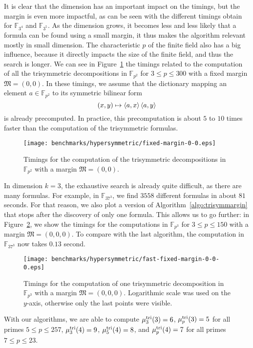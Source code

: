 It is clear that the dimension has an important impact on the timings, but the
margin is even more impactful, as can be seen with the different timings obtain
for $\mathbb{F}_{3^4}$ and $\mathbb{F}_{3^5}$. As the dimension grows, it
becomes less and less likely that a formula can be found using a small margin,
it thus makes the algorithm relevant mostly in small dimension. The
characteristic $p$ of the finite field also has a big influence, because it
directly impacts the size of the finite field, and thus the search is longer. We
can see in Figure~\ref{fig:fixed-margin-0-0} the timings related to the
computation of all the trisymmetric decompositions in $\mathbb{F}_{p^2}$ for
$3\leq p\leq 300$ with a fixed margin $\mathfrak M =(0,0)$. In these timings, we
assume that the dictionary mapping an element $a\in\mathbb{F}_{p^2}$ to its
symmetric bilinear form
\[
  (x,y)\mapsto\left\langle a,x\right\rangle\left\langle a,y\right\rangle
\]
is already precomputed. In practice, this precomputation is about $5$ to $10$
times faster than the computation of the trisymmetric formulas.
\begin{figure}
  \centering
  \texttt{[image: benchmarks/hypersymmetric/fixed-margin-0-0.eps]}
  \caption{Timings for the computation of the trisymmetric decompositions in
    $\mathbb{F}_{p^2}$ with a margin $\mathfrak M=(0,0)$.}
  \label{fig:fixed-margin-0-0}
\end{figure}
In dimension $k=3$, the exhaustive search is already quite difficult, as there
are many formulas. For example, in $\mathbb{F}_{37^3}$, we find $3558$ different
formulas in about $81$ seconds. For that reason, we also plot a version of
Algorithm~\ref{algo:trisymmargin} that stops after the discovery of only one formula.
This allows us to go further: in Figure~\ref{fig:fast-fixed-margin-0-0-0}, we
show the timings for the computations in $\mathbb{F}_{p^3}$ for $3\leq p\leq
150$ with a margin $\mathfrak M=(0,0,0)$. To compare with the last algorithm,
the computation in $\mathbb{F}_{37^3}$ now takes $0.13$ second.
\begin{figure}
  \centering
  \texttt{[image: benchmarks/hypersymmetric/fast-fixed-margin-0-0-0.eps]}
  \caption{Timings for the computation of one trisymmetric decomposition in
    $\mathbb{F}_{p^3}$ with a margin $\mathfrak M=(0,0,0)$. Logarithmic scale
  was used on the $y$-axis, otherwise only the last points were visible.}
  \label{fig:fast-fixed-margin-0-0-0}
\end{figure}
With our algorithms, we are able to compute $\mu^{\textrm{tri}}_3(3)=6$,
$\mu^{\textrm{tri}}_p(3)=5$ for all primes $5\leq p\leq 257$,
$\mu^{\textrm{tri}}_3(4)=9$, $\mu^{\textrm{tri}}_5(4)=8$, and $\mu^{\textrm{tri}}_p(4)=7$ for all primes $7\leq p\leq 23$.
